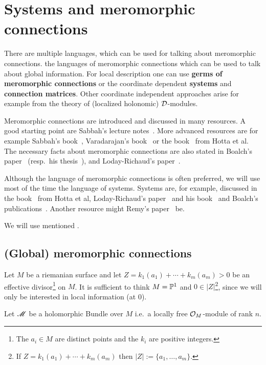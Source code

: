 \chapter{Systems and meromorphic connections}
There are multiple languages, which can be used for talking about meromorphic
connections.
 the languages of meromorphic connections which can be used to
talk about global information.
For local description one can use \textbf{germs of meromorphic connections} or
the coordinate dependent \textbf{systems} and \textbf{connection matrices}.
Other coordinate independent approaches arise for example from the theory of
(localized holonomic) $\cD$-modules.

Meromorphic connections are introduced and discussed in many resources.
A good starting point are Sabbah's lecture notes~\cite{sabbah_cimpa90}.
More advanced resources are for example
Sabbah's book~\cite{sabbah2007isomonodromic},
Varadarajan's book~\cite{Varadarajan96linearmeromorphic} or the
book~\cite{hotta2008} from Hotta et al.
The necessary facts about meromorphic connections are also stated in
Boalch's paper~\cite{boalch} (resp.\ his thesis~\cite{thboalch}),
and Loday-Richaud's paper~\cite{Loday1994}.

Although the language of meromorphic connections is often preferred, we will
use most of the time the language of systems.
Systems are, for example, discussed in the book~\cite{hotta2008} from Hotta et
al, Loday-Richaud's paper~\cite{Loday1994} and his book~\cite{Loday2014} and
Boalch's publications~\cite{boalch,thboalch}. Another resource might Remy's
paper~\cite{Remy2014} be.

We will use  mentioned .

\section{(Global) meromorphic connections}
Let $M$ be a riemanian surface and let $Z=k_1(a_1)+\cdots+k_m(a_m)>0$ be an
effective divisor\footnote{The $a_i\in M$ are distinct points and the $k_i$ are
positive integers.} on $M$.
It is sufficient to think $M=\P^1$ and $0\in|Z|$\footnote{If
$Z=k_1(a_1)+\cdots+k_m(a_m)$ then $|Z|:=\{a_1,\dots,a_m\}$.}, since we will
only be interested in local information (at $0$).

Let $\sM$ be a holomorphic Bundle over $M$ i.e.\ a locally free $\cO_M$-module
of rank $n$.

